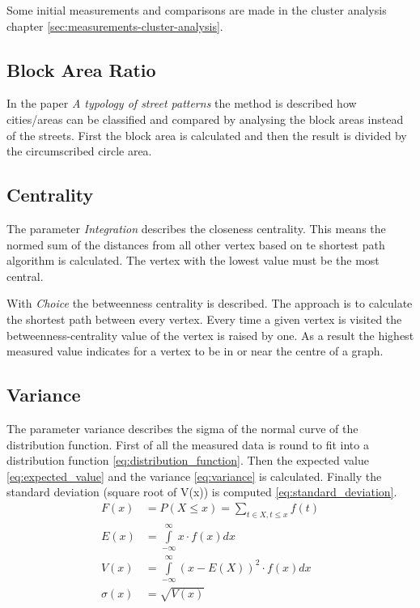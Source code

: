 Some initial measurements and comparisons are made in the cluster analysis chapter \ref{sec:measurements-cluster-analysis}.

\subsection{Block Area Ratio}
In the paper \textit{A typology of street patterns}\citep{blockArea:2014} the method is described how cities/areas can be classified and compared by analysing the block areas instead of the streets. First the block area is calculated and then the result is divided by the circumscribed circle area.

\subsection{Centrality}
The parameter \textit{Integration} describes the closeness centrality. This means the normed sum of the distances from all other vertex based on te shortest path algorithm is calculated. The vertex with the lowest value must be the most central.

With \textit{Choice} the betweenness centrality is described. The approach is to calculate the shortest path between every vertex. Every time a given vertex is visited the betweenness-centrality value of the vertex is raised by one. As a result the highest measured value indicates for a vertex to be in or near the centre of a graph.

\subsection{Variance}
The parameter variance describes the sigma of the normal curve of the distribution function.
First of all the measured data is round to fit into a distribution function \ref{eq:distribution_function}. Then the expected value \ref{eq:expected_value} and the variance \ref{eq:variance} is calculated. Finally the standard deviation (square root of V(x)) is computed \ref{eq:standard_deviation}.
\begin{align}
\label{eq:distribution_function} 
F(x) &= P(X \leq x) =  \sum_{t\in{X}, t\leq{x}}{f(t)} \\
\label{eq:expected_value} 
E(x) &= \int\limits_{-\infty}^\infty x \cdot f(x)dx \\
\label{eq:variance} 
V(x) &= \int\limits_{-\infty}^\infty (x - E(X))^2 \cdot f(x)dx \\
\label{eq:standard_deviation} 
\sigma(x) &= \sqrt{V(x)}
\end{align}

